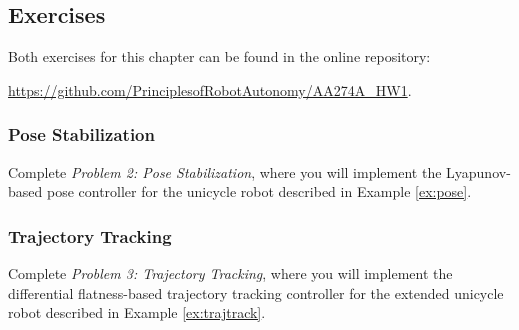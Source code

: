 \subsection{Exercises}
Both exercises for this chapter can be found in the online repository:

\vspace{\baselineskip}

\url{https://github.com/PrinciplesofRobotAutonomy/AA274A_HW1}.

\subsubsection{Pose Stabilization}
Complete \textit{Problem 2: Pose Stabilization}, where you will implement the Lyapunov-based pose controller for the unicycle robot described in Example \ref{ex:pose}.

\subsubsection{Trajectory Tracking}
Complete \textit{Problem 3: Trajectory Tracking}, where you will implement the differential flatness-based trajectory tracking controller for the extended unicycle robot described in Example \ref{ex:trajtrack}.